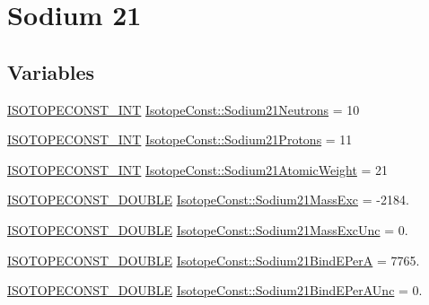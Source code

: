\hypertarget{group___isotope_const-_sodium-_na21}{}\section{Sodium 21}
\label{group___isotope_const-_sodium-_na21}
\subsection*{Variables}
\begin{DoxyCompactItemize}
\item 
\mbox{\hyperlink{group___isotope_const-_macros_ga5f18360b3e99483a35c32d789e62621c}{I\+S\+O\+T\+O\+P\+E\+C\+O\+N\+S\+T\+\_\+\+I\+NT}} \mbox{\hyperlink{group___isotope_const-_sodium-_na21_ga28e36fc8cb64c7b01b6ee10211ea2543}{Isotope\+Const\+::\+Sodium21\+Neutrons}} = 10
\item 
\mbox{\hyperlink{group___isotope_const-_macros_ga5f18360b3e99483a35c32d789e62621c}{I\+S\+O\+T\+O\+P\+E\+C\+O\+N\+S\+T\+\_\+\+I\+NT}} \mbox{\hyperlink{group___isotope_const-_sodium-_na21_gadd63f95d33df7cb7203ee3c8802ffe6d}{Isotope\+Const\+::\+Sodium21\+Protons}} = 11
\item 
\mbox{\hyperlink{group___isotope_const-_macros_ga5f18360b3e99483a35c32d789e62621c}{I\+S\+O\+T\+O\+P\+E\+C\+O\+N\+S\+T\+\_\+\+I\+NT}} \mbox{\hyperlink{group___isotope_const-_sodium-_na21_ga9cc4ac715fb16ef598804af04b6d8eec}{Isotope\+Const\+::\+Sodium21\+Atomic\+Weight}} = 21
\item 
\mbox{\hyperlink{group___isotope_const-_macros_ga8f45a7272ce02c0b4c65c44636ed719a}{I\+S\+O\+T\+O\+P\+E\+C\+O\+N\+S\+T\+\_\+\+D\+O\+U\+B\+LE}} \mbox{\hyperlink{group___isotope_const-_sodium-_na21_ga22d7d0fac9be3d290f2e2b07324338a3}{Isotope\+Const\+::\+Sodium21\+Mass\+Exc}} = -\/2184.
\item 
\mbox{\hyperlink{group___isotope_const-_macros_ga8f45a7272ce02c0b4c65c44636ed719a}{I\+S\+O\+T\+O\+P\+E\+C\+O\+N\+S\+T\+\_\+\+D\+O\+U\+B\+LE}} \mbox{\hyperlink{group___isotope_const-_sodium-_na21_ga6cafd20bff09fcb91f419a76ab24cabd}{Isotope\+Const\+::\+Sodium21\+Mass\+Exc\+Unc}} = 0.
\item 
\mbox{\hyperlink{group___isotope_const-_macros_ga8f45a7272ce02c0b4c65c44636ed719a}{I\+S\+O\+T\+O\+P\+E\+C\+O\+N\+S\+T\+\_\+\+D\+O\+U\+B\+LE}} \mbox{\hyperlink{group___isotope_const-_sodium-_na21_gacf7770bf667726cc4e836118654469dc}{Isotope\+Const\+::\+Sodium21\+Bind\+E\+PerA}} = 7765.
\item 
\mbox{\hyperlink{group___isotope_const-_macros_ga8f45a7272ce02c0b4c65c44636ed719a}{I\+S\+O\+T\+O\+P\+E\+C\+O\+N\+S\+T\+\_\+\+D\+O\+U\+B\+LE}} \mbox{\hyperlink{group___isotope_const-_sodium-_na21_gaae52ac53e219579b43ee3b617959b07e}{Isotope\+Const\+::\+Sodium21\+Bind\+E\+Per\+A\+Unc}} = 0.

\end{DoxyCompactItemize}
